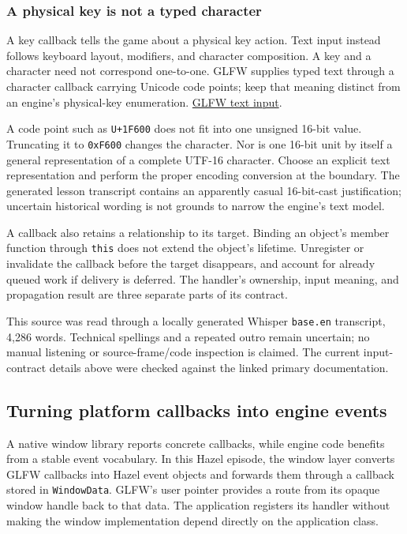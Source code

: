 \subsubsection{A physical key is not a typed character}\label{05-engine-i-ch013-a-physical-key-is-not-a-typed-character}

A key callback tells the game about a physical key action. Text input instead follows keyboard layout, modifiers, and character composition. A key and a character need not correspond one-to-one. GLFW supplies typed text through a character callback carrying Unicode code points; keep that meaning distinct from an engine's physical-key enumeration. \href{https://www.glfw.org/docs/latest/input_guide.html\#input_char}{GLFW text input}.

A code point such as \texttt{U+1F600} does not fit into one unsigned 16-bit value. Truncating it to \texttt{0xF600} changes the character. Nor is one 16-bit unit by itself a general representation of a complete UTF-16 character. Choose an explicit text representation and perform the proper encoding conversion at the boundary. The generated lesson transcript contains an apparently casual 16-bit-cast justification; uncertain historical wording is not grounds to narrow the engine's text model.

A callback also retains a relationship to its target. Binding an object's member function through \texttt{this} does not extend the object's lifetime. Unregister or invalidate the callback before the target disappears, and account for already queued work if delivery is deferred. The handler's ownership, input meaning, and propagation result are three separate parts of its contract.

This source was read through a locally generated Whisper \texttt{base.en} transcript, 4,286 words. Technical spellings and a repeated outro remain uncertain; no manual listening or source-frame/code inspection is claimed. The current input-contract details above were checked against the linked primary documentation.

\subsection{Turning platform callbacks into engine events}\label{05-engine-i-ch013-turning-platform-callbacks-into-engine-events}

A native window library reports concrete callbacks, while engine code benefits from a stable event vocabulary. In this Hazel episode, the window layer converts GLFW callbacks into Hazel event objects and forwards them through a callback stored in \texttt{WindowData}. GLFW's user pointer provides a route from its opaque window handle back to that data. The application registers its handler without making the window implementation depend directly on the application class.

